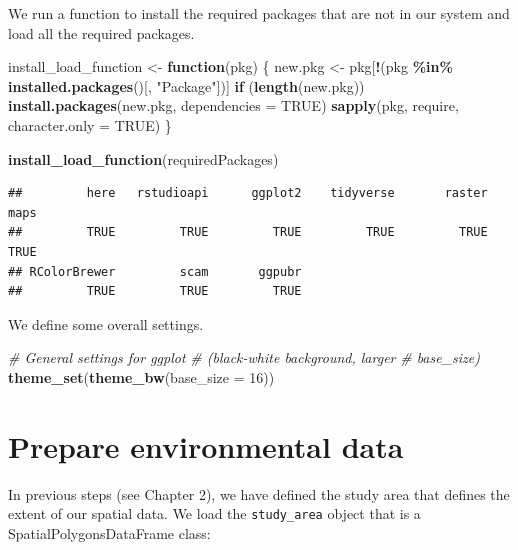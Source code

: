 \documentclass[
]{book}
\newenvironment{Shaded}{\begin{snugshade}}{\end{snugshade}}
\newcommand{\AttributeTok}[1]{\textcolor[rgb]{0.13,0.29,0.53}{#1}}
\newcommand{\CommentTok}[1]{\textcolor[rgb]{0.56,0.35,0.01}{\textit{#1}}}
\newcommand{\ConstantTok}[1]{\textcolor[rgb]{0.56,0.35,0.01}{#1}}
\newcommand{\ControlFlowTok}[1]{\textcolor[rgb]{0.13,0.29,0.53}{\textbf{#1}}}
\newcommand{\DecValTok}[1]{\textcolor[rgb]{0.00,0.00,0.81}{#1}}
\newcommand{\FunctionTok}[1]{\textcolor[rgb]{0.13,0.29,0.53}{\textbf{#1}}}
\newcommand{\NormalTok}[1]{#1}
\newcommand{\OtherTok}[1]{\textcolor[rgb]{0.56,0.35,0.01}{#1}}
\newcommand{\SpecialCharTok}[1]{\textcolor[rgb]{0.81,0.36,0.00}{\textbf{#1}}}
\newcommand{\StringTok}[1]{\textcolor[rgb]{0.31,0.60,0.02}{#1}}
\begin{document}
We run a function to install the required packages that are not in our system and load all the required packages.

\begin{Shaded}
\begin{Highlighting}[]
\NormalTok{install\_load\_function }\OtherTok{\textless{}{-}} \ControlFlowTok{function}\NormalTok{(pkg) \{}
\NormalTok{    new.pkg }\OtherTok{\textless{}{-}}\NormalTok{ pkg[}\SpecialCharTok{!}\NormalTok{(pkg }\SpecialCharTok{\%in\%} \FunctionTok{installed.packages}\NormalTok{()[,}
        \StringTok{"Package"}\NormalTok{])]}
    \ControlFlowTok{if}\NormalTok{ (}\FunctionTok{length}\NormalTok{(new.pkg))}
        \FunctionTok{install.packages}\NormalTok{(new.pkg, }\AttributeTok{dependencies =} \ConstantTok{TRUE}\NormalTok{)}
    \FunctionTok{sapply}\NormalTok{(pkg, require, }\AttributeTok{character.only =} \ConstantTok{TRUE}\NormalTok{)}
\NormalTok{\}}

\FunctionTok{install\_load\_function}\NormalTok{(requiredPackages)}
\end{Highlighting}
\end{Shaded}

\begin{verbatim}
##         here   rstudioapi      ggplot2    tidyverse       raster         maps 
##         TRUE         TRUE         TRUE         TRUE         TRUE         TRUE 
## RColorBrewer         scam       ggpubr 
##         TRUE         TRUE         TRUE
\end{verbatim}

We define some overall settings.

\begin{Shaded}
\begin{Highlighting}[]
\CommentTok{\# General settings for ggplot}
\CommentTok{\# (black{-}white background, larger}
\CommentTok{\# base\_size)}
\FunctionTok{theme\_set}\NormalTok{(}\FunctionTok{theme\_bw}\NormalTok{(}\AttributeTok{base\_size =} \DecValTok{16}\NormalTok{))}
\end{Highlighting}
\end{Shaded}

\section{Prepare environmental data}\label{prepare-environmental-data}

In previous steps (see Chapter 2), we have defined the study area that defines the extent of our spatial data. We load the \texttt{study\_area} object that is a SpatialPolygonsDataFrame class:
\end{document}
